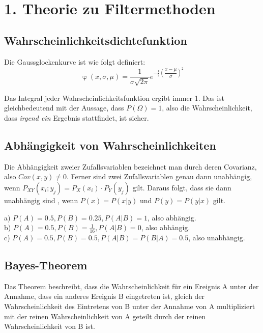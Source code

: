 \documentclass{../Vorlage/mat}
\begin{document}
 \\

\section*{1. Theorie zu Filtermethoden}
\subsection*{Wahrscheinlichkeitsdichtefunktion}
Die Gaussglockenkurve ist wie folgt definiert:
\begin{equation}
	\upvarphi(x, \sigma, \mu) = \dfrac{1}{\sigma\sqrt{2\pi}}e^{-\frac{1}{2}\left(\dfrac{x-\mu}{\sigma}\right)^2}
\end{equation}

Das Integral jeder Wahrscheinlichkeitsfunktion ergibt immer 1. Das
 ist gleichbedeutend mit der Aussage, dass $P(\Omega) = 1$, also die Wahrscheinlichkeit, dass \textit{irgend ein} Ergebnis stattfindet, ist sicher.

\subsection*{Abhängigkeit von Wahrscheinlichkeiten}

Die Abhängigkeit zweier Zufallsvariablen bezeichnet man durch deren Covarianz, also $Cov(x,y) \neq 0$. Ferner sind zwei Zufallsvariablen genau dann unabhängig, wenn $P_{XY}(x_i;y_j) = P_X(x_i)\cdot P_Y(y_j)$ gilt. Daraus folgt, dass sie dann unabhängig sind , wenn $P(x) = P(x | y)$ und $P(y) = P(y | x)$ gilt.

a) 
$P(A) = 0.5 , P(B) = 0.25, P(A|B) = 1$, also abhängig.\\
b)
$P(A) = 0.5, P(B) = \frac{1}{16}, P(A|B) = 0$, also abhängig.\\
c)
$P(A) = 0.5, P(B) = 0.5, P(A|B) = P(B|A) = 0.5$, also unabhängig.


\subsection*{Bayes-Theorem}
Das Theorem beschreibt, dass die Wahrscheinlichkeit für ein Ereignis A unter der Annahme, dass ein anderes Ereignis B eingetreten ist, gleich der Wahrscheinlichkeit des Eintretens von B unter der Annahme von A multipliziert mit der reinen Wahrscheinlichkeit von A geteilt durch der reinen Wahrscheinlichkeit von B ist.
\end{document}
